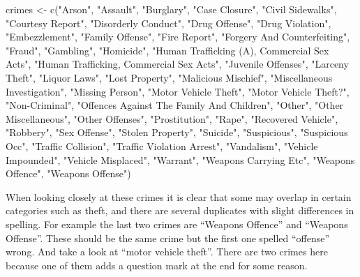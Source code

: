\documentclass[
]{krantz}
\makeatletter
\newenvironment{Shaded}{\begin{snugshade}}{\end{snugshade}}
\newcommand{\FunctionTok}[1]{\textcolor[rgb]{0,0,0}{#1}}
\newcommand{\NormalTok}[1]{#1}
\newcommand{\OtherTok}[1]{\textcolor[rgb]{0.37,0.37,0.37}{#1}}
\newcommand{\StringTok}[1]{\textcolor[rgb]{0.5,0.5,0.5}{#1}}
\newenvironment{kframe}{%
\medskip{}
\setlength{\fboxsep}{.8em}
 \def\at@end@of@kframe{}%
 \ifinner\ifhmode%
  \def\at@end@of@kframe{\end{minipage}}%
  \begin{minipage}{\columnwidth}%
 \fi\fi%
 \def\FrameCommand##1{\hskip\@totalleftmargin \hskip-\fboxsep
 \colorbox{shadecolor}{##1}\hskip-\fboxsep
     \hskip-\linewidth \hskip-\@totalleftmargin \hskip\columnwidth}%
 \MakeFramed {\advance\hsize-\width
   \@totalleftmargin\z@ \linewidth\hsize
   \@setminipage}}%
 {\par\unskip\endMakeFramed%
 \at@end@of@kframe}
\renewenvironment{Shaded}{\begin{kframe}}{\end{kframe}}
\makeatother
\begin{document}
\begin{Shaded}
\begin{Highlighting}[]
\NormalTok{crimes }\OtherTok{\textless{}{-}} \FunctionTok{c}\NormalTok{(}\StringTok{"Arson"}\NormalTok{, }\StringTok{"Assault"}\NormalTok{, }\StringTok{"Burglary"}\NormalTok{, }\StringTok{"Case Closure"}\NormalTok{,}
  \StringTok{"Civil Sidewalks"}\NormalTok{, }\StringTok{"Courtesy Report"}\NormalTok{, }\StringTok{"Disorderly Conduct"}\NormalTok{,}
  \StringTok{"Drug Offense"}\NormalTok{, }\StringTok{"Drug Violation"}\NormalTok{, }\StringTok{"Embezzlement"}\NormalTok{, }\StringTok{"Family Offense"}\NormalTok{,}
  \StringTok{"Fire Report"}\NormalTok{, }\StringTok{"Forgery And Counterfeiting"}\NormalTok{, }\StringTok{"Fraud"}\NormalTok{,}
  \StringTok{"Gambling"}\NormalTok{, }\StringTok{"Homicide"}\NormalTok{, }\StringTok{"Human Trafficking (A), Commercial Sex Acts"}\NormalTok{,}
  \StringTok{"Human Trafficking, Commercial Sex Acts"}\NormalTok{, }\StringTok{"Juvenile Offenses"}\NormalTok{,}
  \StringTok{"Larceny Theft"}\NormalTok{, }\StringTok{"Liquor Laws"}\NormalTok{, }\StringTok{"Lost Property"}\NormalTok{, }\StringTok{"Malicious Mischief"}\NormalTok{,}
  \StringTok{"Miscellaneous Investigation"}\NormalTok{, }\StringTok{"Missing Person"}\NormalTok{, }\StringTok{"Motor Vehicle Theft"}\NormalTok{,}
  \StringTok{"Motor Vehicle Theft?"}\NormalTok{, }\StringTok{"Non{-}Criminal"}\NormalTok{, }\StringTok{"Offences Against The Family And Children"}\NormalTok{,}
  \StringTok{"Other"}\NormalTok{, }\StringTok{"Other Miscellaneous"}\NormalTok{, }\StringTok{"Other Offenses"}\NormalTok{, }\StringTok{"Prostitution"}\NormalTok{,}
  \StringTok{"Rape"}\NormalTok{, }\StringTok{"Recovered Vehicle"}\NormalTok{, }\StringTok{"Robbery"}\NormalTok{, }\StringTok{"Sex Offense"}\NormalTok{,}
  \StringTok{"Stolen Property"}\NormalTok{, }\StringTok{"Suicide"}\NormalTok{, }\StringTok{"Suspicious"}\NormalTok{, }\StringTok{"Suspicious Occ"}\NormalTok{,}
  \StringTok{"Traffic Collision"}\NormalTok{, }\StringTok{"Traffic Violation Arrest"}\NormalTok{, }\StringTok{"Vandalism"}\NormalTok{,}
  \StringTok{"Vehicle Impounded"}\NormalTok{, }\StringTok{"Vehicle Misplaced"}\NormalTok{, }\StringTok{"Warrant"}\NormalTok{,}
  \StringTok{"Weapons Carrying Etc"}\NormalTok{, }\StringTok{"Weapons Offence"}\NormalTok{, }\StringTok{"Weapons Offense"}\NormalTok{)}
\end{Highlighting}
\end{Shaded}

When looking closely at these crimes it is clear that some may overlap in certain categories such as theft, and there are several duplicates with slight differences in spelling. For example the last two crimes are ``Weapons Offence'' and ``Weapons Offense''. These should be the same crime but the first one spelled ``offense'' wrong. And take a look at ``motor vehicle theft''. There are two crimes here because one of them adds a question mark at the end for some reason.
\end{document}
